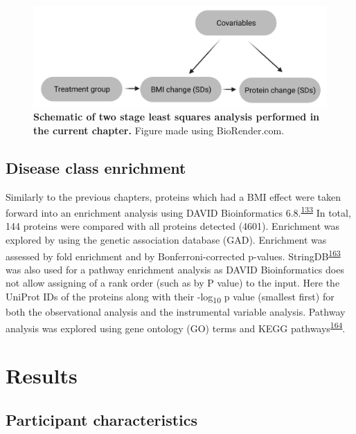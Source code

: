 \documentclass[11pt,twoside]{bristolthesis}
\begin{document}
\begin{figure}
\includegraphics{figure/DiRECT/DiRECT_analysis} \caption[Schematic of two stage least squares analysis performed using DiRECT data]{\textbf{Schematic of two stage least squares analysis performed in the current chapter.} Figure made using BioRender.com.}\label{fig:direct-tsls}
\end{figure}
\hypertarget{disease-class-enrichment}{%
\subsection{Disease class enrichment}\label{disease-class-enrichment}}

Similarly to the previous chapters, proteins which had a BMI effect were taken forward into an enrichment analysis using DAVID Bioinformatics 6.8.\textsuperscript{\protect\hyperlink{ref-Huang2009}{133}} In total, 144 proteins were compared with all proteins detected (4601). Enrichment was explored by using the genetic association database (GAD). Enrichment was assessed by fold enrichment and by Bonferroni-corrected p-values. StringDB\textsuperscript{\protect\hyperlink{ref-Szklarczyk2021}{163}} was also used for a pathway enrichment analysis as DAVID Bioinformatics does not allow assigning of a rank order (such as by P value) to the input. Here the UniProt IDs of the proteins along with their -log\textsubscript{10} p value (smallest first) for both the observational analysis and the instrumental variable analysis. Pathway analysis was explored using gene ontology (GO) terms and KEGG pathways\textsuperscript{\protect\hyperlink{ref-Kanehisa2016}{164}}.

\hypertarget{results-4}{%
\section{Results}\label{results-4}}

\hypertarget{participant-characteristics-2}{%
\subsection{Participant characteristics}\label{participant-characteristics-2}}
\end{document}
